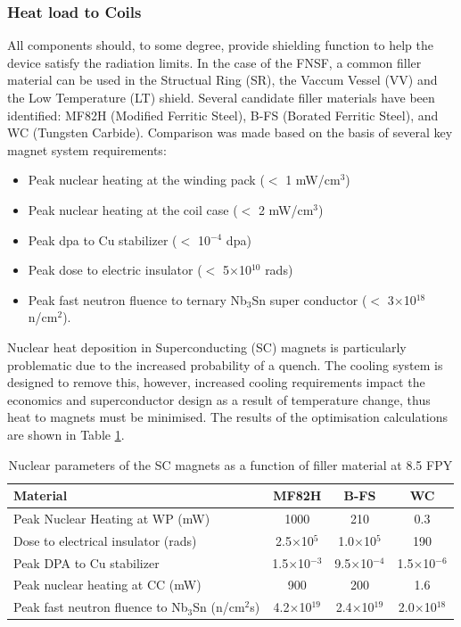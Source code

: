 \documentclass[12pt, letterpaper]{elsarticle}
\begin{document}
\subsubsection{Heat load to Coils}
All components should, to some degree, provide shielding function to help the device satisfy the radiation limits. In the case of the FNSF, a common filler material can be used in the Structual Ring (SR), the Vaccum Vessel (VV) and the Low Temperature (LT) shield. Several candidate filler materials have been identified: MF82H (Modified Ferritic Steel), B-FS (Borated Ferritic Steel), and WC (Tungsten Carbide). Comparison was made based on the basis of several key magnet system requirements:
\begin{itemize}
  \item{Peak nuclear heating at the winding pack ($<$ 1 mW/cm$^3$)}
  \item{Peak nuclear heating at the coil case ($<$ 2 mW/cm$^3$)}
  \item{Peak dpa to Cu stabilizer ($<$ 10$^{-4}$ dpa)}
  \item{Peak dose to electric insulator ($<$ 5$\times$10$^{10}$ rads)}
  \item{Peak fast neutron fluence to ternary Nb$_3$Sn super conductor ($<$ 3$\times$10$^{18}$ n/cm$^2$).}
\end{itemize}
Nuclear heat deposition in Superconducting (SC) magnets is particularly problematic due to the increased probability of a quench. The cooling system is designed to remove this, however, increased cooling requirements impact the economics and superconductor design as a result of temperature change, thus heat to magnets must be minimised. The results of the optimisation calculations are shown in Table \ref{tab:1dcalc}.
\begin{table}[ht!]
 \begin{tabular}{| l | c | c | c |} 
 \hline 
 Material & MF82H & B-FS & WC \\
 \hline
 Peak Nuclear Heating at WP (mW) & 1000 & 210 & 0.3 \\
 Dose to electrical insulator (rads) & 2.5$\times$10$^5$ & 1.0$\times$10$^5$ & 190 \\
 Peak DPA to Cu stabilizer & 1.5$\times$10$^{-3}$ & 9.5$\times$10$^{-4}$ & 1.5$\times$10$^{-6}$ \\
 Peak nuclear heating at CC (mW) & 900 & 200 & 1.6 \\
 Peak fast neutron fluence to Nb$_3$Sn (n/cm$^2$s) & 4.2$\times$10$^{19}$ & 2.4$\times$10$^{19}$ & 2.0$\times$10$^{18}$ \\ 
 \hline
 \end{tabular}
 \caption{Nuclear parameters of the SC magnets as a function of filler material at 8.5 FPY}
 \label{tab:1dcalc}
\end{table}
\end{document}
